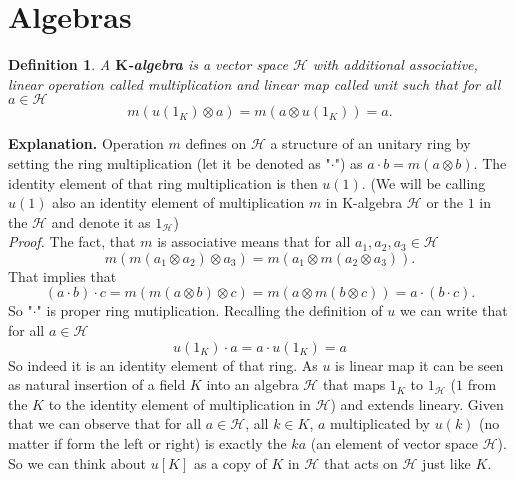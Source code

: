 \documentclass[a4paper, 12pt]{report}
\newtheorem{definition}{Definition}
\begin{document}
\section{Algebras}
\begin{definition}
A \textbf{$\textbf{K}$-algebra} is a vector space $\mathcal{H}$ with additional
associative, linear operation
 called multiplication and linear map
 called unit such that for all $a \in \mathcal{H}$
\begin{equation*}
m(u(1_K) \otimes a) = m(a \otimes u(1_K)) = a.
\end{equation*}
\end{definition}
\textbf{Explanation. } Operation $m$ defines on $\mathcal{H}$ a structure of an unitary ring by setting the
ring multiplication (let it be denoted as "$\cdot$") as $a \cdot b = m(a \otimes b)$. The identity element 
of that ring multiplication is then $u(1)$. (We will be calling $u(1)$ also an identity element of
multiplication $m$ in K-algebra $\mathcal{H}$ or the $1$ in the $\mathcal{H}$ and 
denote it as $1_\mathcal{H}$)\\
\textit{Proof.} The fact, that $m$ is associative means that for all $a_1, a_2, a_3 \in \mathcal{H}$
\begin{equation*}
m(m(a_1 \otimes a_2) \otimes a_3) = m(a_1 \otimes m(a_2 \otimes a_3)).
\end{equation*}
That implies that
\begin{equation*}
(a\cdot b) \cdot c = m(m(a \otimes b) \otimes c) = m(a \otimes m(b \otimes c)) = a \cdot (b \cdot c).
\end{equation*}
So "$\cdot$" is proper ring mutiplication. Recalling the definition of $u$ we can write that for all 
$a \in \mathcal{H}$
\begin{equation*}
u(1_K) \cdot a = a \cdot u(1_K) = a
\end{equation*}
So indeed it is an identity
element of that ring. As $u$ is linear map it can be seen as natural insertion of a field $K$ into an 
algebra $\mathcal{H}$ that maps $1_K$ to $1_\mathcal{H}$ ($1$ from the $K$ to the identity element of 
multiplication in $\mathcal{H}$) and extends lineary. Given that we can observe
that for all $a \in \mathcal{H}$, all $k \in K$, $a$ multiplicated by $u(k)$ (no matter if form the left
or right) is exactly the $ka$ (an element of vector space $\mathcal{H}$).
So we can think about $u[K]$ as a copy of $K$ in $\mathcal{H}$ that acts on $\mathcal{H}$ just like $K$.\\
\end{document}
